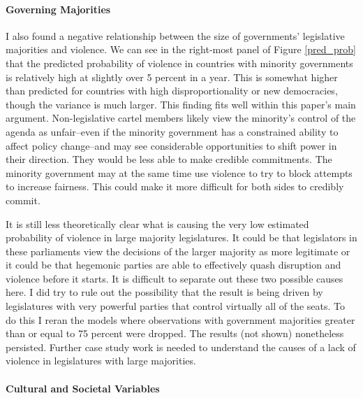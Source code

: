 \documentclass[a4paper]{article}\usepackage[]{graphicx}\usepackage[]{color}
\begin{document}
\paragraph{Governing Majorities}

I also found a negative relationship between the size of governments' legislative majorities and violence. We can see in the right-most panel of Figure \ref{pred_prob} that the predicted probability of violence in countries with minority governments is relatively high at slightly over 5 percent in a year. This is somewhat higher than predicted for countries with high disproportionality or new democracies, though the variance is much larger. This finding fits well within this paper's main argument. Non-legislative cartel members likely view the minority's control of the agenda as unfair--even if the minority government has a constrained ability to affect policy change--and may see considerable opportunities to shift power in their direction. They would be less able to make credible commitments. The minority government may at the same time use violence to try to block attempts to increase fairness. This could make it more difficult for both sides to credibly commit. 

It is still less theoretically clear what is causing the very low estimated probability of violence in large majority legislatures. It could be that legislators in these parliaments view the decisions of the larger majority as more legitimate or it could be that hegemonic parties are able to effectively quash disruption and violence before it starts. It is difficult to separate out these two possible causes here. I did try to rule out the possibility that the result is being driven by legislatures with very powerful parties that control virtually all of the seats. To do this I reran the models where observations with government majorities greater than or equal to 75 percent were dropped. The results (not shown) nonetheless persisted. Further case study work is needed to understand the causes of a lack of violence in legislatures with large majorities.

\paragraph{Cultural and Societal Variables}
\end{document}
